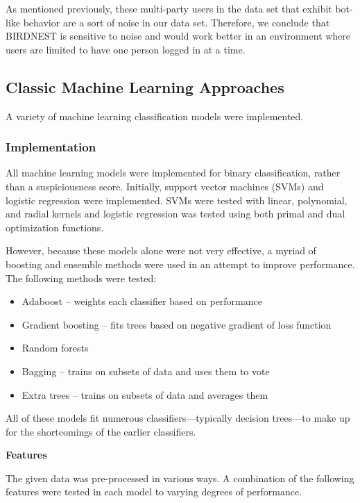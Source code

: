 \documentclass{article} %
\begin{document}
As mentioned previously, these multi-party users in the data set that exhibit bot-like behavior are a sort of noise in our data set. Therefore, we conclude that BIRDNEST is sensitive to noise and would work better in an environment where users are limited to have one person logged in at a time.

\subsection{Classic Machine Learning Approaches}

A variety of machine learning classification models were implemented.

\subsubsection{Implementation}

All machine learning models were implemented for binary classification, rather than a suspiciousness score.
Initially, support vector machines (SVMs) and logistic regression were implemented.
SVMs were tested with linear, polynomial, and radial kernels and logistic regression was tested using both primal and dual optimization functions.

However, because these models alone were not very effective, a myriad of boosting and ensemble methods were used in an attempt to improve performance.
The following methods were tested:

\begin{itemize}
\item Adaboost -- weights each classifier based on performance
\item Gradient boosting -- fits trees based on negative gradient of loss function
\item Random forests
\item Bagging -- trains on subsets of data and uses them to vote
\item Extra trees -- trains on subsets of data and averages them
\end{itemize}

All of these models fit numerous classifiers---typically decision trees---to make up for the shortcomings of the earlier classifiers.

\textbf{Features}

The given data was pre-processed in various ways.
A combination of the following features were tested in each model to varying degrees of performance.
\end{document}
